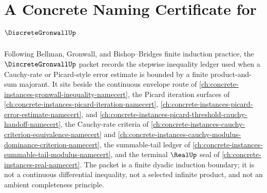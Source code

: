 \chapter{A Concrete Naming Certificate for $\DiscreteGronwallUp$}
\label{ch:concrete-instances-discrete-gronwall-namecert}

Following Bellman, Gronwall, and Bishop--Bridges finite induction practice, the $\DiscreteGronwallUp$ packet records the stepwise inequality ledger used when a Cauchy-rate or Picard-style error estimate is bounded by a finite product-and-sum majorant. It sits beside the continuous envelope route of \autoref{ch:concrete-instances-gronwall-inequality-namecert}, the Picard iteration surfaces of \autoref{ch:concrete-instances-picard-iteration-namecert}, \autoref{ch:concrete-instances-picard-error-estimate-namecert}, and \autoref{ch:concrete-instances-picard-threshold-cauchy-handoff-namecert}, the Cauchy-rate criteria of \autoref{ch:concrete-instances-cauchy-criterion-equivalence-namecert} and \autoref{ch:concrete-instances-cauchy-modulus-dominance-criterion-namecert}, the summable-tail ledger of \autoref{ch:concrete-instances-summable-tail-modulus-namecert}, and the terminal $\RealUp$ seal of \autoref{ch:concrete-instances-real-namecert}. The packet is a finite dyadic induction boundary; it is not a continuous differential inequality, not a selected infinite product, and not an ambient completeness principle.

